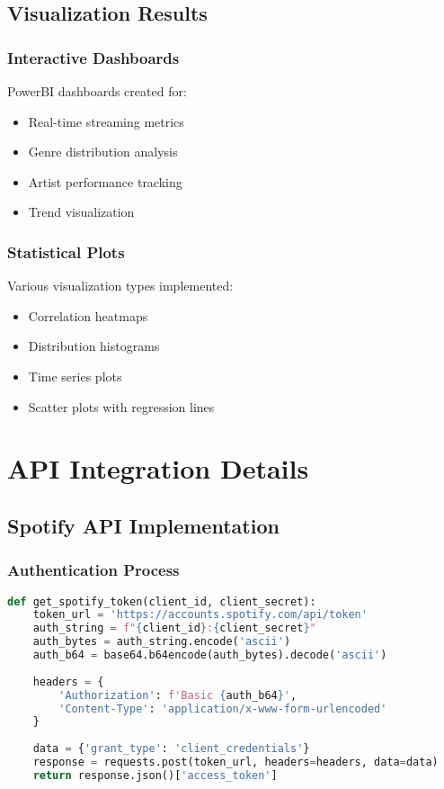\documentclass[12pt,a4paper]{article}
\begin{document}
\subsection{Visualization Results}
\subsubsection{Interactive Dashboards}
PowerBI dashboards created for:
\begin{itemize}
    \item Real-time streaming metrics
    \item Genre distribution analysis
    \item Artist performance tracking
    \item Trend visualization
\end{itemize}

\subsubsection{Statistical Plots}
Various visualization types implemented:
\begin{itemize}
    \item Correlation heatmaps
    \item Distribution histograms
    \item Time series plots
    \item Scatter plots with regression lines
\end{itemize}

\section{API Integration Details}

\subsection{Spotify API Implementation}
\subsubsection{Authentication Process}
\begin{lstlisting}[language=Python]
def get_spotify_token(client_id, client_secret):
    token_url = 'https://accounts.spotify.com/api/token'
    auth_string = f"{client_id}:{client_secret}"
    auth_bytes = auth_string.encode('ascii')
    auth_b64 = base64.b64encode(auth_bytes).decode('ascii')
    
    headers = {
        'Authorization': f'Basic {auth_b64}',
        'Content-Type': 'application/x-www-form-urlencoded'
    }
    
    data = {'grant_type': 'client_credentials'}
    response = requests.post(token_url, headers=headers, data=data)
    return response.json()['access_token']
\end{lstlisting}
\end{document}
